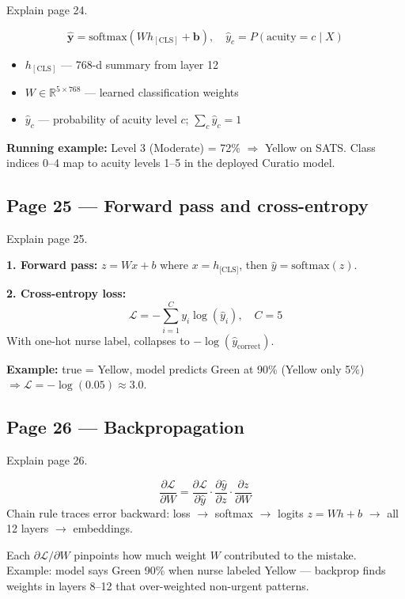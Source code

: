 \documentclass[11pt]{article}
\begin{document}
\begin{questionbox}
Explain page 24.
\end{questionbox}

\begin{answerbox}
\[
\hat{\mathbf{y}} = \mathrm{softmax}(W h_{[\mathrm{CLS}]} + \mathbf{b}), \quad \hat{y}_c = P(\text{acuity} = c \mid X)
\]
\begin{itemize}
  \item $h_{[\mathrm{CLS}]}$ --- 768-d summary from layer 12
  \item $W \in \mathbb{R}^{5 \times 768}$ --- learned classification weights
  \item $\hat{y}_c$ --- probability of acuity level $c$; $\sum_c \hat{y}_c = 1$
\end{itemize}
\textbf{Running example:} Level 3 (Moderate) = 72\% $\Rightarrow$ Yellow on SATS. Class indices 0--4 map to acuity levels 1--5 in the deployed Curatio model.
\end{answerbox}

\subsection{Page 25 --- Forward pass and cross-entropy}

\begin{questionbox}
Explain page 25.
\end{questionbox}

\begin{answerbox}
\textbf{1. Forward pass:} $z = Wx + b$ where $x = h_{[\mathrm{CLS]}}$, then $\hat{y} = \mathrm{softmax}(z)$.

\textbf{2. Cross-entropy loss:}
\[
\mathcal{L} = -\sum_{i=1}^{C} y_i \log(\hat{y}_i), \quad C = 5
\]
With one-hot nurse label, collapses to $-\log(\hat{y}_{\text{correct}})$.

\textbf{Example:} true = Yellow, model predicts Green at 90\% (Yellow only 5\%) $\Rightarrow \mathcal{L} = -\log(0.05) \approx 3.0$.
\end{answerbox}

\subsection{Page 26 --- Backpropagation}

\begin{questionbox}
Explain page 26.
\end{questionbox}

\begin{answerbox}
\[
\frac{\partial \mathcal{L}}{\partial W} = \frac{\partial \mathcal{L}}{\partial \hat{y}} \cdot \frac{\partial \hat{y}}{\partial z} \cdot \frac{\partial z}{\partial W}
\]
Chain rule traces error backward: loss $\to$ softmax $\to$ logits $z = Wh + b$ $\to$ all 12 layers $\to$ embeddings.

Each $\partial \mathcal{L}/\partial W$ pinpoints how much weight $W$ contributed to the mistake. Example: model says Green 90\% when nurse labeled Yellow --- backprop finds weights in layers 8--12 that over-weighted non-urgent patterns.
\end{answerbox}
\end{document}
